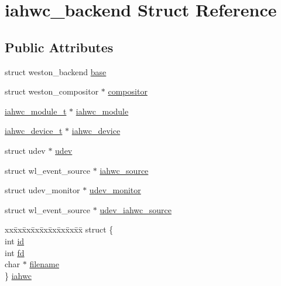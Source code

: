 \hypertarget{structiahwc__backend}{}\section{iahwc\+\_\+backend Struct Reference}
\label{structiahwc__backend}
\subsection*{Public Attributes}
\begin{DoxyCompactItemize}
\item 
struct weston\+\_\+backend \mbox{\hyperlink{structiahwc__backend_ae18b2807a275166da755b8d581fed9df}{base}}
\item 
struct weston\+\_\+compositor $\ast$ \mbox{\hyperlink{structiahwc__backend_aff09ba1b906f8c90ab72d6ea9e2604d1}{compositor}}
\item 
\mbox{\hyperlink{iahwc_8h_a6a0009d570fc041f403dee1e0fd68cf9}{iahwc\+\_\+module\+\_\+t}} $\ast$ \mbox{\hyperlink{structiahwc__backend_a2461d5cf72f5c1a53021d8a0cfc13ced}{iahwc\+\_\+module}}
\item 
\mbox{\hyperlink{iahwc_8h_aa44e63a48d7c328d160f28888a6b3edd}{iahwc\+\_\+device\+\_\+t}} $\ast$ \mbox{\hyperlink{structiahwc__backend_a51a72ed97e57edb8d9ac90a0331cd5c4}{iahwc\+\_\+device}}
\item 
struct udev $\ast$ \mbox{\hyperlink{structiahwc__backend_abeae3866ace09fded61e453b79f65bb3}{udev}}
\item 
struct wl\+\_\+event\+\_\+source $\ast$ \mbox{\hyperlink{structiahwc__backend_af61090e88d7d5da92836b2e8ca24e200}{iahwc\+\_\+source}}
\item 
struct udev\+\_\+monitor $\ast$ \mbox{\hyperlink{structiahwc__backend_ac719de9c1f60ef6a7467146430f5f017}{udev\+\_\+monitor}}
\item 
struct wl\+\_\+event\+\_\+source $\ast$ \mbox{\hyperlink{structiahwc__backend_aa0eec87be32613771a08de5b9db049ed}{udev\+\_\+iahwc\+\_\+source}}
\item 
\begin{tabbing}
xx\=xx\=xx\=xx\=xx\=xx\=xx\=xx\=xx\=\kill
struct \{\\
\>int \mbox{\hyperlink{structiahwc__backend_ab40e91d97ef75d0dfcedf72629ab9e41}{id}}\\
\>int \mbox{\hyperlink{structiahwc__backend_ab041d01c689a974d72c2515470c3c441}{fd}}\\
\>char $\ast$ \mbox{\hyperlink{structiahwc__backend_af34ed10fa4d2996a450c37e4337f111b}{filename}}\\
\} \mbox{\hyperlink{structiahwc__backend_a1a0cf789154c92044ad8ac724258ea26}{iahwc}}\\


\end{tabbing}
\end{DoxyCompactItemize}
